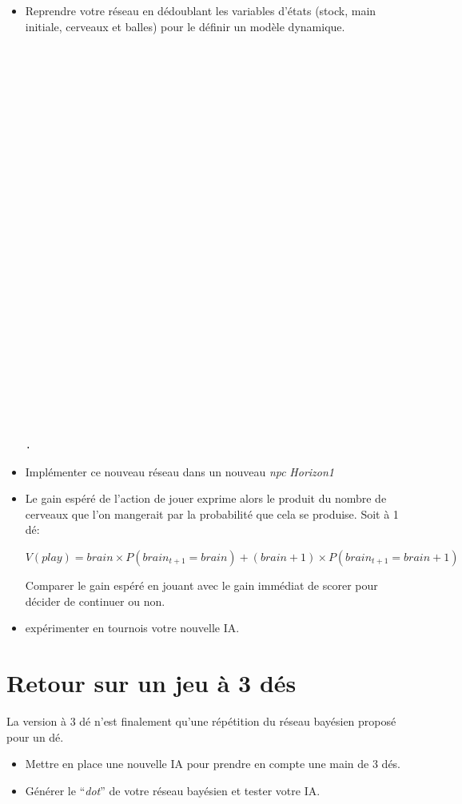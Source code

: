 \documentclass[a4paper, 10pt]{article}
\begin{document}
  \begin{itemize}[$\bigcirc$]
      \item Reprendre votre réseau en dédoublant les variables d'états (stock, main initiale, cerveaux et balles) pour le définir un modèle dynamique.

      \begin{lstlisting}[caption={Réseau bayésien dynamique}]

























.
\end{lstlisting}

    \item Implémenter ce nouveau réseau dans un nouveau \emph{npc} \emph{Horizon1}

    \item Le gain espéré de l'action de jouer exprime alors le produit du nombre de cerveaux que l'on mangerait par la probabilité que cela se produise.
    Soit à 1 dé:

    $V(\mathit{play})= \mathit{brain} \times P(\mathit{brain}_{t+1}= \mathit{brain}) + (\mathit{brain}+1) \times P(\mathit{brain}_{t+1}= \mathit{brain}+1)$

    Comparer le gain espéré en jouant avec le gain immédiat de scorer pour décider de continuer ou non.

     \item expérimenter en tournois votre nouvelle IA.

  \end{itemize}

  \section{Retour sur un jeu à 3 dés}

  La version à $3$ dé n'est finalement qu'une répétition du réseau bayésien proposé pour un dé.

\begin{itemize}[$\bigcirc$]
   \item Mettre en place une nouvelle IA pour prendre en compte une main de $3$ dés.
   \item Générer le ``\emph{dot}'' de votre réseau bayésien et tester votre IA.
  \end{itemize}
\end{document}
